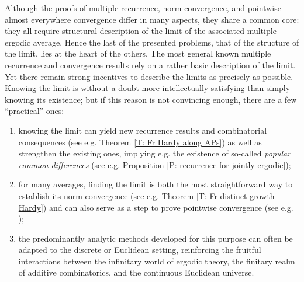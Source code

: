 \documentclass[11pt]{amsart}
\theoremstyle{definition}
\newcommand{\1}{{\mathbf{1}}}
\begin{document}
Although the proofs of multiple recurrence, norm convergence, and pointwise almost everywhere convergence differ in many aspects, 
they share a common core: they all require  structural description of the limit of the associated multiple ergodic average. Hence the last of the presented problems, that of the structure of the limit,
lies at the heart of the others. 
The most general known multiple recurrence and convergence results rely on a rather basic description of the limit.
Yet there remain strong incentives to describe the limits as precisely as possible. Knowing the limit is without a doubt more intellectually satisfying than simply knowing its existence; but if this reason is not convincing enough, there are a few ``practical'' ones:
\begin{enumerate}
    \item knowing the limit can yield new recurrence results and combinatorial consequences (see e.g. Theorem \ref{T: Fr Hardy along APs}) as well as strengthen the existing ones, implying e.g. the existence of so-called \emph{popular common differences} (see e.g. Proposition \ref{P: recurrence for jointly ergodic});
    \item for many averages, finding the limit is both the most straightforward way to establish its norm convergence (see e.g. Theorem \ref{T: Fr distinct-growth Hardy}) and can also serve as a step to prove pointwise convergence (see e.g. \cite{DS21, HSY19b});
    \item the predominantly analytic methods developed for this purpose can often be adapted to the discrete or Euclidean setting, reinforcing the fruitful interactions between the infinitary world of ergodic theory, the finitary realm of additive combinatorics, and the continuous Euclidean universe.
\end{enumerate}
\end{document}

